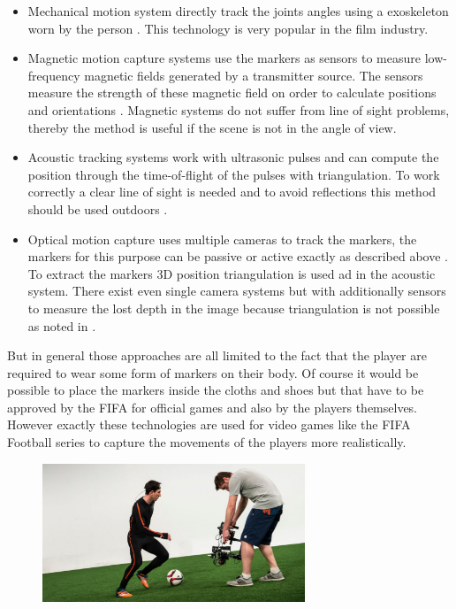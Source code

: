 \begin{itemize}
	\item Mechanical motion system directly track the joints angles using a exoskeleton worn by the person \cite{motionWiki}. This technology is very popular in the film industry. 
	\item Magnetic motion capture systems use the markers as sensors to measure low-frequency magnetic fields generated by a transmitter source. The sensors measure the strength of these magnetic field on order to calculate positions and orientations \cite{magnetic,motionWiki, xsens}. Magnetic systems do not suffer from line of sight problems, thereby the method is useful if the scene is not in the angle of view.
	\item Acoustic tracking systems work with ultrasonic pulses and can compute the position through the time-of-flight of the pulses with triangulation. To work correctly a clear line of sight is needed and to avoid reflections this method should be used outdoors \cite{xsens}.
	\item Optical motion capture uses multiple cameras to track the markers, the markers for this purpose can be passive or active exactly as described above \cite{xsens}. To extract the markers 3D position triangulation is used ad in the acoustic system. There exist even single camera systems but with additionally sensors to measure the lost depth in the image because triangulation is  not possible as noted in \cite{motioncapturetechnologies}.
\end{itemize} 
But in general those approaches are all limited to the fact that the player are required to wear some form of markers on their body. Of course it would be possible to place the markers inside the cloths and shoes but that have to be approved by the FIFA for official games and also by the players themselves. However exactly these technologies are used for video games like the FIFA Football series to capture the movements of the players more realistically.
\begin{figure}[h]
	\centering
	\includegraphics[width=0.7\textwidth]{./images/messi.jpg}
	\label{fig:messi}
\end{figure}
